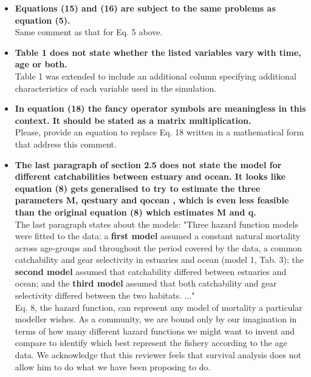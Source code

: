 \documentclass[11pt]{article}
\begin{document}
\begin{spacing}{1.2}
\begin{itemize}
\item {\bf Equations (15) and (16) are subject to the same problems as equation (5).} \\
Same comment as that for Eq. 5 above. \\

\item {\bf Table 1 does not state whether the listed variables vary with time, age or both.}\\
Table 1 was extended to include an additional column specifying additional characteristics of each variable used in the simulation. \\

\item {\bf In equation (18) the fancy operator symbols are meaningless in this context.  It should be stated as a matrix multiplication.} \\
Please, provide an equation to replace Eq. 18 written in a mathematical form that address this comment.\\

\item {\bf The last paragraph of section 2.5 does not state the model for different catchabilities between estuary and ocean.  It looks like equation (8) gets generalised to try to estimate the three parameters M, qestuary and qocean , which is even less feasible than the original equation (8) which estimates M and q.} \\
The last paragraph states about the models: "Three hazard function models were fitted to the data: a {\bf first model} assumed a constant natural mortality across age-groups and throughout the period covered by the data, a common catchability and gear selectivity in estuaries and ocean (model 1, Tab. 3); the {\bf second model} assumed that catchability differed between estuaries and ocean; and the {\bf third model} assumed that both catchability and gear selectivity differed between the two habitats. ..."\\ 
Eq. 8, the hazard function, can represent any model of mortality a particular modeller wishes. As a community, we are bound only by our imagination in terms of how many different hazard functions we might want to invent and compare to identify which best represent the fishery according to the age data. We acknowledge that this reviewer feels that survival analysis does not allow him to do what we have been proposing to do. \\


\end{itemize}
\end{spacing}
\end{document}
